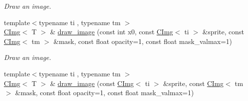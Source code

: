 \begin{DoxyCompactItemize}
\begin{DoxyCompactList}\small\item\em Draw an image. \item\end{DoxyCompactList}\item 
\hypertarget{structcimg__library_1_1CImg_a8e324ba8d4367bdcacebc33817fd8e22}{
{\footnotesize template$<$typename ti , typename tm $>$ }\\\hyperlink{structcimg__library_1_1CImg}{CImg}$<$ T $>$ \& \hyperlink{structcimg__library_1_1CImg_a8e324ba8d4367bdcacebc33817fd8e22}{draw\_\-image} (const int x0, const \hyperlink{structcimg__library_1_1CImg}{CImg}$<$ ti $>$ \&sprite, const \hyperlink{structcimg__library_1_1CImg}{CImg}$<$ tm $>$ \&mask, const float opacity=1, const float mask\_\-valmax=1)}
\label{structcimg__library_1_1CImg_a8e324ba8d4367bdcacebc33817fd8e22}

\begin{DoxyCompactList}\small\item\em Draw an image. \item\end{DoxyCompactList}\item 
\hypertarget{structcimg__library_1_1CImg_abb5c6c380e17aa9fc0628c70eb42908a}{
{\footnotesize template$<$typename ti , typename tm $>$ }\\\hyperlink{structcimg__library_1_1CImg}{CImg}$<$ T $>$ \& \hyperlink{structcimg__library_1_1CImg_abb5c6c380e17aa9fc0628c70eb42908a}{draw\_\-image} (const \hyperlink{structcimg__library_1_1CImg}{CImg}$<$ ti $>$ \&sprite, const \hyperlink{structcimg__library_1_1CImg}{CImg}$<$ tm $>$ \&mask, const float opacity=1, const float mask\_\-valmax=1)}
\label{structcimg__library_1_1CImg_abb5c6c380e17aa9fc0628c70eb42908a}


\end{DoxyCompactItemize}
